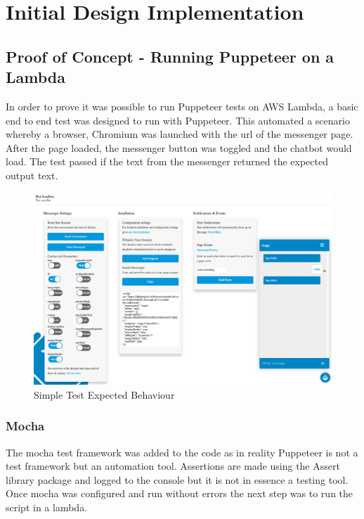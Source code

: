 \documentclass[12pt,a4paper,titlepage]{report}
\begin{document}
\chapter{Initial Design Implementation}

\section{Proof of Concept - Running Puppeteer on a Lambda}

In order to prove it was possible to run Puppeteer tests on AWS Lambda, a basic end to end test was designed
to run with Puppeteer. This automated a scenario whereby a browser, Chromium was launched with the url of the
messenger page. After the page loaded, the messenger button was toggled and the chatbot would load. The test
passed if the text from the messenger returned the expected output text.

\begin{figure}[h]
  \centering
  \includegraphics[width=\linewidth,height=\textheight,keepaspectratio]{././diagrams/simple_test.png}
  \caption{Simple Test Expected Behaviour}
\end{figure}
\newpage

\subsection{Mocha}

The mocha test framework was added to the code as in reality Puppeteer is not a test framework but an automation tool.
Assertions are made using the Assert library package and logged to the console but it is not in essence a testing tool.
Once mocha was configured and run without errors the next step was to run the script in a lambda.
\end{document}
